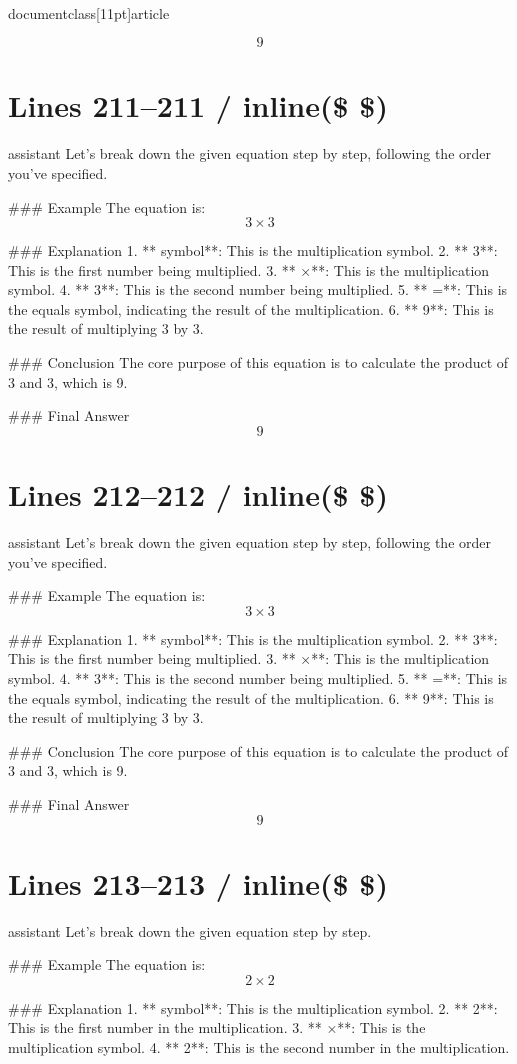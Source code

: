\\documentclass[11pt]{article}
\begin{document}
\[
\boxed{9}
\]


\section*{Lines 211–211 / inline(\$ \$) }
assistant
Let's break down the given equation step by step, following the order you've specified.

### Example
The equation is:
\[ 3 \times 3 \]

### Explanation
1. ** symbol**: This is the multiplication symbol.
2. ** 3**: This is the first number being multiplied.
3. ** ×**: This is the multiplication symbol.
4. ** 3**: This is the second number being multiplied.
5. ** =**: This is the equals symbol, indicating the result of the multiplication.
6. ** 9**: This is the result of multiplying 3 by 3.

### Conclusion
The core purpose of this equation is to calculate the product of 3 and 3, which is 9.

### Final Answer
\[
\boxed{9}
\]


\section*{Lines 212–212 / inline(\$ \$) }
assistant
Let's break down the given equation step by step, following the order you've specified.

### Example
The equation is:
\[ 3 \times 3 \]

### Explanation
1. ** symbol**: This is the multiplication symbol.
2. ** 3**: This is the first number being multiplied.
3. ** ×**: This is the multiplication symbol.
4. ** 3**: This is the second number being multiplied.
5. ** =**: This is the equals symbol, indicating the result of the multiplication.
6. ** 9**: This is the result of multiplying 3 by 3.

### Conclusion
The core purpose of this equation is to calculate the product of 3 and 3, which is 9.

### Final Answer
\[
\boxed{9}
\]


\section*{Lines 213–213 / inline(\$ \$) }
assistant
Let's break down the given equation step by step.

### Example
The equation is:
\[ 2 \times 2 \]

### Explanation
1. ** symbol**: This is the multiplication symbol.
2. ** 2**: This is the first number in the multiplication.
3. ** ×**: This is the multiplication symbol.
4. ** 2**: This is the second number in the multiplication.
\end{document}

